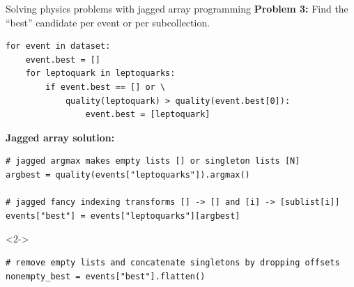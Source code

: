 \documentclass[aspectratio=169]{beamer}
\begin{document}
\begin{frame}[fragile]{Solving physics problems with jagged array programming}
\vspace{0.25 cm}
{\bf Problem 3:} Find the ``best'' candidate per event or per subcollection.
\small
\begin{verbatim}
for event in dataset:
    event.best = []
    for leptoquark in leptoquarks:
        if event.best == [] or \
            quality(leptoquark) > quality(event.best[0]):
                event.best = [leptoquark]
\end{verbatim}
\normalsize

\vspace{0.5 cm}
{\bf Jagged array solution:} 
\small
\begin{verbatim}
# jagged argmax makes empty lists [] or singleton lists [N]
argbest = quality(events["leptoquarks"]).argmax()

# jagged fancy indexing transforms [] -> [] and [i] -> [sublist[i]]
events["best"] = events["leptoquarks"][argbest]
\end{verbatim}

\vspace{0.05 cm}
\begin{uncoverenv}<2->
\begin{verbatim}
# remove empty lists and concatenate singletons by dropping offsets
nonempty_best = events["best"].flatten()
\end{verbatim}
\end{uncoverenv}
\end{frame}
\end{document}

